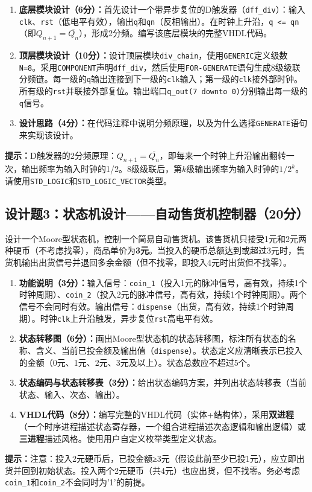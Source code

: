 \begin{enumerate}[label=(\arabic*)]
  \item \textbf{底层模块设计（6分）：}首先设计一个带异步复位的D触发器（\texttt{dff\_div}）：输入\texttt{clk}、\texttt{rst}（低电平有效），输出\texttt{q}和\texttt{qn}（反相输出）。在时钟上升沿，\texttt{q <= qn}（即$Q_{n+1} = \overline{Q_n}$），形成2分频。编写该底层模块的完整VHDL代码。
  \item \textbf{顶层模块设计（10分）：}设计顶层模块\texttt{div\_chain}，使用\texttt{GENERIC}定义级数\texttt{N=8}。采用\texttt{COMPONENT}声明\texttt{dff\_div}，然后使用\texttt{FOR-GENERATE}语句生成8级级联分频链。每一级的\texttt{q}输出连接到下一级的\texttt{clk}输入；第一级的\texttt{clk}接外部时钟。所有级的\texttt{rst}并联接外部复位。输出端口\texttt{q\_out(7~downto~0)}分别输出每一级的\texttt{q}信号。
  \item \textbf{设计思路（4分）：}在代码注释中说明分频原理，以及为什么选择\texttt{GENERATE}语句来实现该设计。
\end{enumerate}

\begin{framed}
\textbf{提示：}D触发器的2分频原理：$Q_{n+1}=\overline{Q_n}$，即每来一个时钟上升沿输出翻转一次，输出频率为输入时钟的1/2。8级级联后，第$k$级输出频率为输入时钟的$1/2^k$。请使用\texttt{STD\_LOGIC}和\texttt{STD\_LOGIC\_VECTOR}类型。
\end{framed}

\subsection*{设计题3：状态机设计——自动售货机控制器（20分）}

设计一个Moore型状态机，控制一个简易自动售货机。该售货机只接受1元和2元两种硬币（不考虑找零），商品单价为\textbf{3元}。当投入的硬币总额达到或超过3元时，售货机输出出货信号并退回多余金额（但不找零，即投入4元时出货但不找零）。

\begin{enumerate}[label=(\arabic*)]
  \item \textbf{功能说明（3分）：}输入信号：\texttt{coin\_1}（投入1元的脉冲信号，高有效，持续1个时钟周期）、\texttt{coin\_2}（投入2元的脉冲信号，高有效，持续1个时钟周期）。两个信号不会同时有效。输出信号：\texttt{dispense}（出货，高有效，持续1个时钟周期）。时钟\texttt{clk}上升沿触发，异步复位\texttt{rst}高电平有效。
  \item \textbf{状态转移图（6分）：}画出Moore型状态机的状态转移图，标注所有状态的名称、含义、当前已投金额及输出值（\texttt{dispense}）。状态定义应清晰表示已投入的金额（0元、1元、2元、3元及以上）。状态总数应不超过5个。
  \item \textbf{状态编码与状态转移表（3分）：}给出状态编码方案，并列出状态转移表（当前状态、输入、次态、输出）。
  \item \textbf{VHDL代码（8分）：}编写完整的VHDL代码（实体+结构体），采用\textbf{双进程}（一个时序进程描述状态寄存器，一个组合进程描述次态逻辑和输出逻辑）或\textbf{三进程}描述风格。使用用户自定义枚举类型定义状态。
\end{enumerate}

\begin{framed}
\textbf{提示：}注意：投入2元硬币后，已投金额≥3元（假设此前至少已投1元），应立即出货并回到初始状态。投入两个2元硬币（共4元）也应出货，但不找零。务必考虑\texttt{coin\_1}和\texttt{coin\_2}不会同时为'1'的前提。
\end{framed}

\endinput
